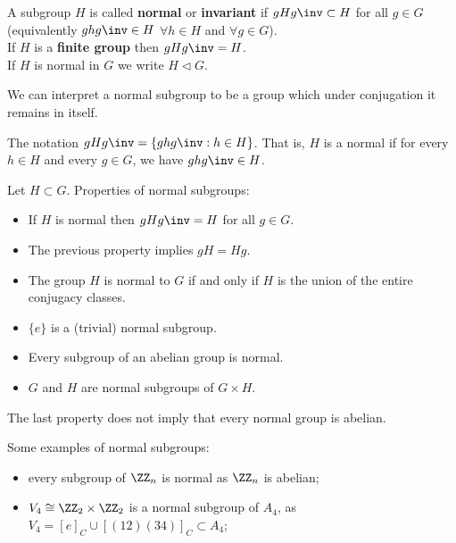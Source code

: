 \documentclass[12pt, a4paper]{article}
\begin{document}
\begin{definition}
    A subgroup \(H\) is called \textbf{normal} or \textbf{invariant} if \(gHg\inv \subset H\) for all \(g\in G\) (equivalently \(ghg\inv \in H\) \(\forall h \in H\) and \(\forall g\in G\)). \\
    If \(H\) is a \textbf{finite group} then \(gHg\inv =H\). \\
    If \(H\) is normal in \(G\) we write \(H \triangleleft G\).
\end{definition}

\begin{mdnote}
    We can interpret a normal subgroup to be a group which under conjugation it remains in itself.
\end{mdnote}

\begin{mdremark}
    The notation \(gHg\inv = \{ghg\inv : h\in H\}\). That is, \(H\) is a normal if for every \(h\in H\) and every \(g \in G\), we have \(ghg\inv \in H\).
\end{mdremark}

\begin{mdprop}
    Let \(H \subset G\). Properties of normal subgroups:
    \begin{itemize}
        \item If \(H\) is normal then \(gHg\inv = H\) for all \(g \in G\).
        \item The previous property implies \(gH=Hg\).
        \item The group \(H\) is normal to \(G\) if and only if \(H\) is the union of the entire conjugacy classes.
        \item \(\{e\}\) is a (trivial) normal subgroup.
        \item Every subgroup of an abelian group is normal.
        \item \(G\) and \(H\) are normal subgroups of \(G\times H\).
    \end{itemize}
\end{mdprop}

\begin{mdremark}
    The last property does not imply that every normal group is abelian. 
\end{mdremark}

\begin{example}
    Some examples of normal subgroups:
    \begin{itemize}
        \item every subgroup of \(\ZZ_n\) is normal as \(\ZZ_n\) is abelian;
        \item \(V_4 \cong \ZZ_2 \times \ZZ_2\) is a normal subgroup of \(A_4\), as \(V_4 =[e]_C \cup [(12)(34)]_C \subset A_4\);
    \end{itemize}
\end{example}
\end{document}
